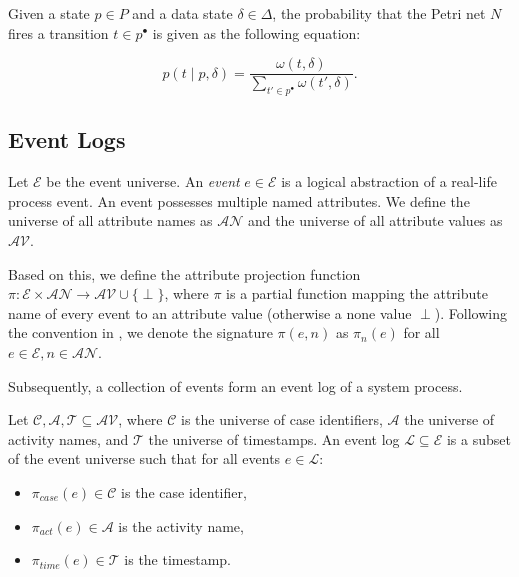 Given a state $p \in P$ and a data state $\delta \in \Delta$, the probability that the Petri net $N$ fires a transition $t \in p^{\bullet}$ is given as the following equation:

\[
    p(t \mid p, \delta) = \frac{\omega(t, \delta)}{\sum_{t' \in p^{\bullet}} \omega(t', \delta)}.
\]

\subsection{Event Logs}

\begin{definition}[Event]
    Let $\mathcal{E}$ be the event universe. An \emph{event} $e \in \mathcal{E}$ is a logical abstraction of a real-life process event. An event possesses multiple named attributes. We define the universe of all attribute names as $\mathcal{AN}$ and the universe of all attribute values as $\mathcal{AV}$.  
\end{definition}

Based on this, we define the attribute projection function $\pi: \mathcal{E} \times \mathcal{AN} \rightarrow \mathcal{AV} \cup \{ \perp \}$, where $\pi$ is a partial function mapping the attribute name of every event to an attribute value (otherwise a none value $\perp$). Following the convention in \cite{bible}, we denote the signature $\pi(e, n)$ as $\pi_n(e)$ for all $e \in \mathcal{E}, n \in \mathcal{AN}$.

Subsequently, a collection of events form an event log of a system process.

\begin{definition}
    Let $\mathcal{C, A, T} \subseteq \mathcal{AV}$, where $\mathcal{C}$ is the universe of case identifiers, $\mathcal{A}$ the universe of activity names, and $\mathcal{T}$ the universe of timestamps.  An event log $\mathcal{L} \subseteq \mathcal{E}$ is a subset of the event universe such that for all events $e \in \mathcal{L}$:
    
    \begin{itemize}
        \item $\pi_{case}(e) \in \mathcal{C}$ is the case identifier,
        \item $\pi_{act}(e) \in \mathcal{A}$ is the activity name,
        \item $\pi_{time}(e) \in \mathcal{T}$ is the timestamp.
    \end{itemize}
\end{definition}

